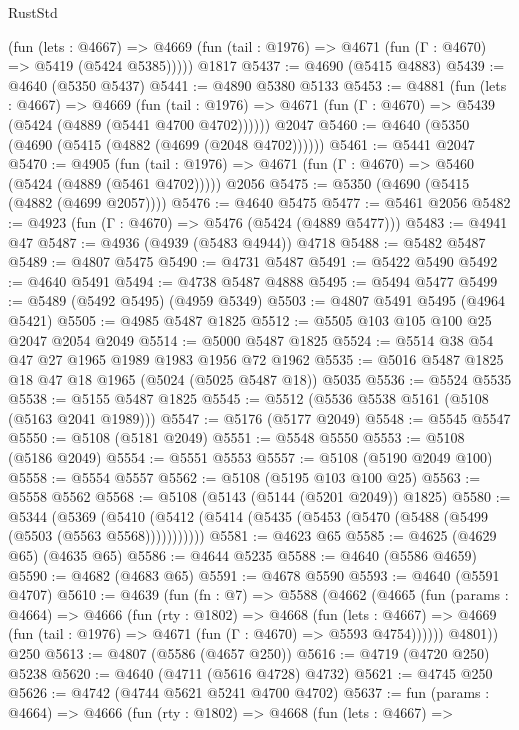\begin{lexlean}{RustStd}
\begin{coremodule}
      (fun (lets : @4667) =>
      @4669 (fun (tail : @1976) => @4671 (fun (Γ : @4670) => @5419 (@5424 @5385)))))
    @1817
@5437 := @4690 (@5415 @4883)
@5439 := @4640 (@5350 @5437)
@5441 := @4890 @5380 @5133
@5453 := @4881
    (fun (lets : @4667) =>
    @4669
      (fun (tail : @1976) => @4671 (fun (Γ : @4670) => @5439 (@5424 (@4889 (@5441 @4700 @4702))))))
    @2047
@5460 := @4640 (@5350 (@4690 (@5415 (@4882 (@4699 (@2048 @4702))))))
@5461 := @5441 @2047
@5470 := @4905
    (fun (tail : @1976) => @4671 (fun (Γ : @4670) => @5460 (@5424 (@4889 (@5461 @4702)))))
    @2056
@5475 := @5350 (@4690 (@5415 (@4882 (@4699 @2057))))
@5476 := @4640 @5475
@5477 := @5461 @2056
@5482 := @4923 (fun (Γ : @4670) => @5476 (@5424 (@4889 @5477)))
@5483 := @4941 @47
@5487 := @4936 (@4939 (@5483 @4944)) @4718
@5488 := @5482 @5487
@5489 := @4807 @5475
@5490 := @4731 @5487
@5491 := @5422 @5490
@5492 := @4640 @5491
@5494 := @4738 @5487 @4888
@5495 := @5494 @5477
@5499 := @5489 (@5492 @5495) (@4959 @5349)
@5503 := @4807 @5491 @5495 (@4964 @5421)
@5505 := @4985 @5487 @1825
@5512 := @5505 @103 @105 @100 @25 @2047 @2054 @2049
@5514 := @5000 @5487 @1825
@5524 := @5514 @38 @54 @47 @27 @1965 @1989 @1983 @1956 @72 @1962
@5535 := @5016 @5487 @1825 @18 @47 @18 @1965 (@5024 (@5025 @5487 @18)) @5035
@5536 := @5524 @5535
@5538 := @5155 @5487 @1825
@5545 := @5512 (@5536 @5538 @5161 (@5108 (@5163 @2041 @1989)))
@5547 := @5176 (@5177 @2049)
@5548 := @5545 @5547
@5550 := @5108 (@5181 @2049)
@5551 := @5548 @5550
@5553 := @5108 (@5186 @2049)
@5554 := @5551 @5553
@5557 := @5108 (@5190 @2049 @100)
@5558 := @5554 @5557
@5562 := @5108 (@5195 @103 @100 @25)
@5563 := @5558 @5562
@5568 := @5108 (@5143 (@5144 (@5201 @2049)) @1825)
@5580 := @5344
    (@5369 (@5410 (@5412 (@5414 (@5435 (@5453 (@5470 (@5488 (@5499 (@5503 (@5563 @5568)))))))))))
@5581 := @4623 @65
@5585 := @4625 (@4629 @65) (@4635 @65)
@5586 := @4644 @5235
@5588 := @4640 (@5586 @4659)
@5590 := @4682 (@4683 @65)
@5591 := @4678 @5590
@5593 := @4640 (@5591 @4707)
@5610 := @4639
    (fun (fn : @7) =>
    @5588
      (@4662
        (@4665
          (fun (params : @4664) =>
          @4666
            (fun (rty : @1802) =>
            @4668
              (fun (lets : @4667) =>
              @4669 (fun (tail : @1976) => @4671 (fun (Γ : @4670) => @5593 @4754))))))
        @4801))
    @250
@5613 := @4807 (@5586 (@4657 @250))
@5616 := @4719 (@4720 @250) @5238
@5620 := @4640 (@4711 (@5616 @4728) @4732)
@5621 := @4745 @250
@5626 := @4742 (@4744 @5621 @5241 @4700 @4702)
@5637 := fun (params : @4664) =>
  @4666
    (fun (rty : @1802) =>
    @4668
      (fun (lets : @4667) =>

\end{coremodule}
\end{lexlean}
